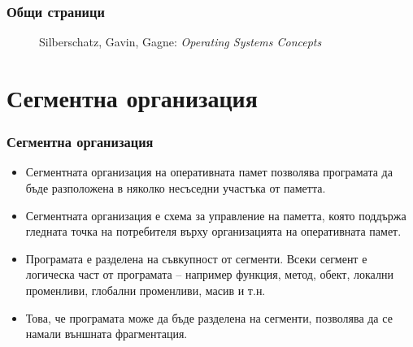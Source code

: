 \documentclass[ignorenonframetext, hyperref=unicode]{beamer}
\begin{document}
\begin{frame}
\frametitle{Общи страници}
\begin{figure}[h]
\center
{}
\caption{Silberschatz, Gavin, Gagne: {\em Operating Systems Concepts}}
\end{figure}
\end{frame}

\section{Сегментна организация}
\begin{frame}
\frametitle{Сегментна организация}
\begin{itemize}
  \item Сегментната организация на оперативната памет позволява програмата да
  бъде разположена в няколко несъседни участъка от паметта.
  \item Сегментната организация е схема за управление на паметта, която
  поддържа гледната точка на потребителя върху организацията на оперативната
  памет. 
  \item Програмата е разделена на съвкупност от сегменти. Всеки сегмент е
  логическа част от програмата -- например функция, метод, обект, локални
  променливи, глобални променливи, масив и т.н.
  \item Това, че програмата може да бъде разделена на сегменти, позволява да се
  намали външната фрагментация.
\end{itemize}
\end{frame}
\end{document}
